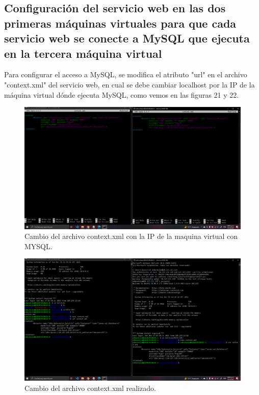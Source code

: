 \documentclass[11pt]{article}
\begin{document}
		\subsection{Configuración del servicio web en las dos primeras máquinas virtuales para que cada servicio web se conecte a MySQL que ejecuta en la tercera máquina virtual}
		Para configurar el acceso a MySQL, se modifica el atributo "url" en el archivo "context.xml" del servicio web, en cual se debe cambiar localhost por la IP de la máquina virtual dónde ejecuta MySQL, como vemos en las figuras 21 y 22.
		\begin{figure}[H]
			\centering
			\includegraphics[scale=0.34]{resources/tp4all.png}
			\caption{Cambio del archivo context.xml con la IP de la maquina virtual con MYSQL.}\label{fig:picture}
		\end{figure}
		\begin{figure}[H]
			\centering
			\includegraphics[scale=0.34]{resources/tp4.1.png}
			\caption{Cambio del archivo context.xml realizado.}\label{fig:picture}
		\end{figure}
\end{document}
